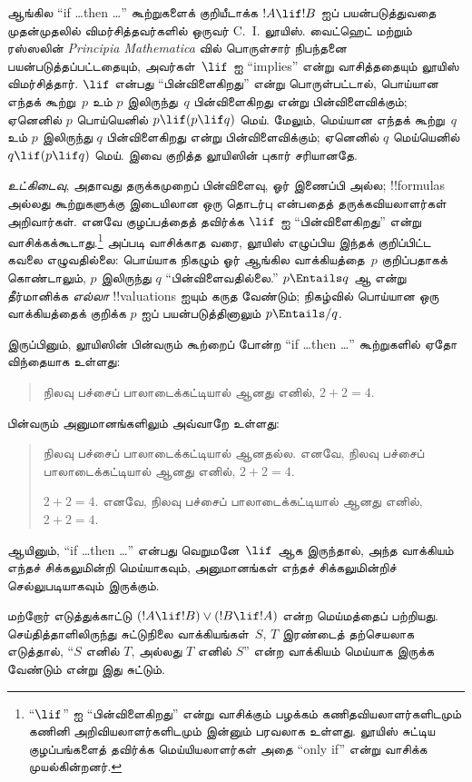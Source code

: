 \documentclass[../../../include/open-logic-section]{subfiles}
\begin{document}


ஆங்கில ``if \dots then \dots'' கூற்றுகளைக் குறியீடாக்க $!A \lif !B$
ஐப் பயன்படுத்துவதை முதன்முதலில் விமர்சித்தவர்களில் ஒருவர் C.~I. லூயிஸ்.
வைட்ஹெட் மற்றும் ரஸ்ஸலின் \emph{Principia Mathematica} வில் பொருள்சார்
நிபந்தனை பயன்படுத்தப்பட்டதையும், அவர்கள்~$\lif$ ஐ ``implies'' என்று
வாசித்ததையும் லூயிஸ் விமர்சித்தார். $\lif$ என்பது ``பின்விளைகிறது''
என்று பொருள்பட்டால், பொய்யான எந்தக் கூற்று~$p$ உம் $p$ இலிருந்து~$q$
பின்விளைகிறது என்று பின்விளைவிக்கும்; ஏனெனில் $p$ பொய்யெனில் $p \lif
(p \lif q)$ மெய். மேலும், மெய்யான எந்தக் கூற்று~$q$ உம் $p$ இலிருந்து
$q$ பின்விளைகிறது என்று பின்விளைவிக்கும்; ஏனெனில் $q$ மெய்யெனில் $q
\lif (p \lif q)$ மெய். இவை குறித்த லூயிஸின் புகார் சரியானதே.

\emph{உட்கிடைவு}, அதாவது தருக்கமுறைப் பின்விளைவு, ஓர் இணைப்பி அல்ல;
!!{formula}s அல்லது கூற்றுகளுக்கு இடையிலான ஒரு தொடர்பு என்பதைத்
தருக்கவியலாளர்கள் அறிவார்கள். எனவே குழப்பத்தைத் தவிர்க்க $\lif$ ஐ
``பின்விளைகிறது'' என்று வாசிக்கக்கூடாது.\footnote{``$\lif$'' ஐ
  ``பின்விளைகிறது'' என்று வாசிக்கும் பழக்கம் கணிதவியலாளர்களிடமும்
  கணினி அறிவியலாளர்களிடமும் இன்னும் பரவலாக உள்ளது. லூயிஸ் சுட்டிய
  குழப்பங்களைத் தவிர்க்க மெய்யியலாளர்கள் அதை ``only if'' என்று
  வாசிக்க முயல்கின்றனர்.} அப்படி வாசிக்காத வரை, லூயிஸ் எழுப்பிய இந்தக்
குறிப்பிட்ட கவலை எழுவதில்லை: பொய்யாக நிகழும் ஓர் ஆங்கில வாக்கியத்தை~$p$
குறிப்பதாகக் கொண்டாலும், $p$ இலிருந்து $q$ ``பின்விளைவதில்லை.'' $p
\Entails q$ ஆ என்று தீர்மானிக்க \emph{எல்லா} !!{valuation}s ஐயும்
கருத வேண்டும்; நிகழ்வில் பொய்யான ஒரு வாக்கியத்தைக் குறிக்க $p$ ஐப்
பயன்படுத்தினாலும் $p \Entails/ q$.

இருப்பினும், லூயிஸின் பின்வரும் கூற்றைப் போன்ற ``if \dots then \dots''
கூற்றுகளில் ஏதோ விந்தையாக உள்ளது:
\begin{quote}
நிலவு பச்சைப் பாலாடைக்கட்டியால் ஆனது எனில், $2+2=4$.
\end{quote}
பின்வரும் அனுமானங்களிலும் அவ்வாறே உள்ளது:
\begin{quote}
  நிலவு பச்சைப் பாலாடைக்கட்டியால் ஆனதல்ல. எனவே, நிலவு பச்சைப்
  பாலாடைக்கட்டியால் ஆனது எனில், $2+2=4$.

  $2+2 = 4$. எனவே, நிலவு பச்சைப் பாலாடைக்கட்டியால் ஆனது எனில்,
  $2+2=4$.
\end{quote}
ஆயினும், ``if \dots then \dots'' என்பது வெறுமனே~$\lif$ ஆக இருந்தால்,
அந்த வாக்கியம் எந்தச் சிக்கலுமின்றி மெய்யாகவும், அனுமானங்கள் எந்தச்
சிக்கலுமின்றிச் செல்லுபடியாகவும் இருக்கும்.

மற்றோர் எடுத்துக்காட்டு $(!A \lif !B) \lor (!B \lif !A)$ என்ற
மெய்மத்தைப் பற்றியது. செய்தித்தாளிலிருந்து சுட்டுநிலை வாக்கியங்கள்~$S$,
$T$ இரண்டைத் தற்செயலாக எடுத்தால், ``$S$ எனில் $T$, அல்லது $T$ எனில்
$S$'' என்ற வாக்கியம் மெய்யாக இருக்க வேண்டும் என்று இது சுட்டும்.
\end{document}
